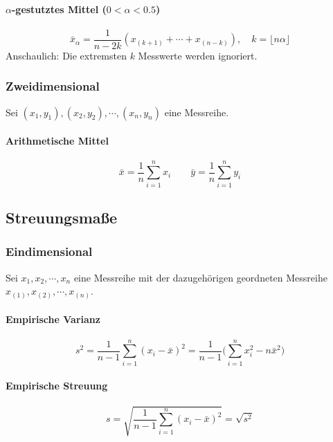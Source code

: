 				\paragraph{\(\alpha\)-gestutztes Mittel (\(0 < \alpha < 0.5\))}
					\begin{equation*}
						\bar{x}_\alpha = \frac{1}{n - 2k} (x_{(k+1)} + \cdots + x_{(n-k)}), \quad k = \lfloor n\alpha \rfloor
					\end{equation*}
					Anschaulich: Die extremsten \(k\) Messwerte werden ignoriert.

			\subsubsection{Zweidimensional}
				Sei \( (x_1, y_1), (x_2, y_2), \cdots, (x_n, y_n) \) eine Messreihe.

				\paragraph{Arithmetische Mittel}
					\begin{equation*}
						\bar{x} = \frac{1}{n} \sum_{i = 1}^{n} x_i \qquad \bar{y} = \frac{1}{n} \sum_{i = 1}^{n} y_i
					\end{equation*}

		\subsection{Streuungsmaße}
			\subsubsection{Eindimensional}
				Sei \( x_1, x_2, \cdots, x_n \) eine Messreihe mit der dazugehörigen geordneten Messreihe \( x_{(1)}, x_{(2)}, \cdots, x_{(n)} \).

				\paragraph{Empirische Varianz}
					\begin{equation*}
						s^2 = \frac{1}{n - 1} \sum_{i = 1}^{n} (x_i - \bar{x})^2 = \frac{1}{n - 1} \Bigg( \sum_{i = 1}^{n} x_i^2 - n \bar{x}^2 \Bigg)
					\end{equation*}

				\paragraph{Empirische Streuung}
					\begin{equation*}
						s = \sqrt{\frac{1}{n - 1} \sum_{i = 1}^{n} (x_i - \bar{x})^2} = \sqrt{s^2}
					\end{equation*}

